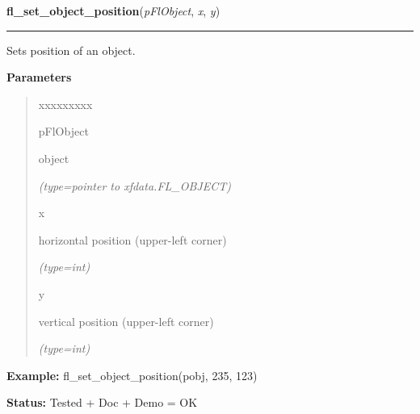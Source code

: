 \hspace{.8\funcindent}\begin{boxedminipage}{\funcwidth}

    \raggedright \textbf{fl\_set\_object\_position}(\textit{pFlObject}, \textit{x}, \textit{y})

    \vspace{-1.5ex}

    \rule{\textwidth}{0.5\fboxrule}
\setlength{\parskip}{2ex}
    Sets position of an object.

\setlength{\parskip}{1ex}
      \textbf{Parameters}
      \vspace{-1ex}

      \begin{quote}
        \begin{Ventry}{xxxxxxxxx}

          \item[pFlObject]

          object

            {\it (type=pointer to xfdata.FL\_OBJECT)}

          \item[x]

          horizontal position (upper-left corner)

            {\it (type=int)}

          \item[y]

          vertical position (upper-left corner)

            {\it (type=int)}

        \end{Ventry}

      \end{quote}

\textbf{Example:} fl\_set\_object\_position(pobj, 235, 123)



\textbf{Status:} Tested + Doc + Demo = OK



    \end{boxedminipage}

    \label{xformslib:flbasic:fl_get_object_size}

    \vspace{0.5ex}

